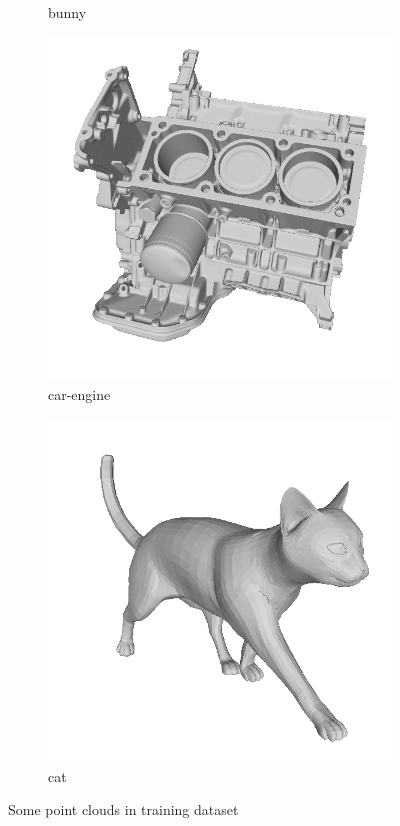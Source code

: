 \begin{figure}[!h]
\begin{subfigure}[b]{0.23\linewidth}
		\caption{bunny}
	\end{subfigure}
	\begin{subfigure}[b]{0.23\linewidth}
		\includegraphics[width=\linewidth]{./Figures/train-dataset/06.car-engine.png}
		\caption{car-engine}
	\end{subfigure}
	\begin{subfigure}[b]{0.23\linewidth}
		\includegraphics[width=\linewidth]{./Figures/train-dataset/07.cat.png}
		\caption{cat}
	\end{subfigure}
	
	\label{fig:dataset-demo}
	\caption{Some point clouds in training dataset}
\end{figure}



